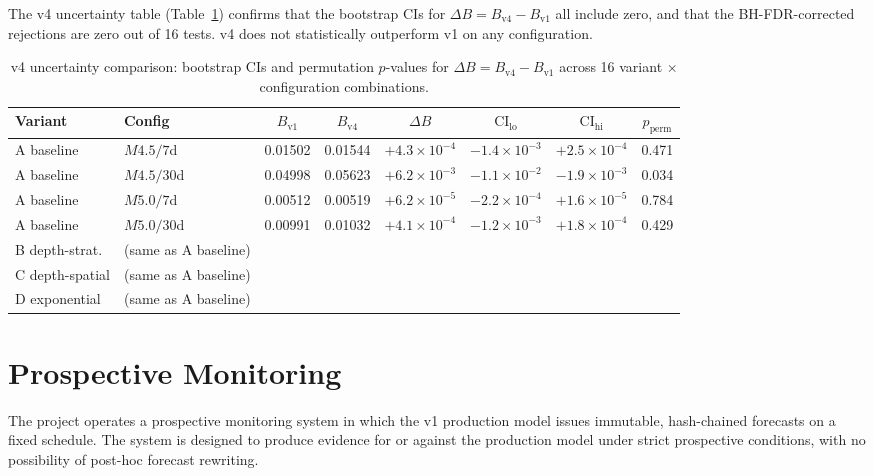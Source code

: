 \documentclass[10pt,a4paper,twocolumn]{article}
\begin{document}
The v4 uncertainty table (Table~\ref{tab:v4-uncertainty}) confirms that the bootstrap CIs for $\Delta B = B_{\text{v4}} - B_{\text{v1}}$ all include zero, and that the BH-FDR-corrected rejections are zero out of 16 tests. v4 does not statistically outperform v1 on any configuration.

\begin{table}[t]
\centering
\caption{v4 uncertainty comparison: bootstrap CIs and permutation $p$-values for $\Delta B = B_{\text{v4}} - B_{\text{v1}}$ across 16 variant $\times$ configuration combinations.}\label{tab:v4-uncertainty}
\small
\begin{tabular*}{\textwidth}{@{\extracolsep{\fill}}llcccccc}
\toprule
Variant & Config & $B_{\text{v1}}$ & $B_{\text{v4}}$ & $\Delta B$ & $\text{CI}_{\text{lo}}$ & $\text{CI}_{\text{hi}}$ & $p_{\text{perm}}$ \\
\midrule
A baseline        & $M4.5/7$d  & 0.01502 & 0.01544 & $+4.3\times10^{-4}$ & $-1.4\times10^{-3}$ & $+2.5\times10^{-4}$ & 0.471 \\
A baseline        & $M4.5/30$d & 0.04998 & 0.05623 & $+6.2\times10^{-3}$ & $-1.1\times10^{-2}$ & $-1.9\times10^{-3}$ & 0.034 \\
A baseline        & $M5.0/7$d  & 0.00512 & 0.00519 & $+6.2\times10^{-5}$ & $-2.2\times10^{-4}$ & $+1.6\times10^{-5}$ & 0.784 \\
A baseline        & $M5.0/30$d & 0.00991 & 0.01032 & $+4.1\times10^{-4}$ & $-1.2\times10^{-3}$ & $+1.8\times10^{-4}$ & 0.429 \\
B depth-strat.    & (same as A baseline) & & & & & & \\
C depth-spatial   & (same as A baseline) & & & & & & \\
D exponential     & (same as A baseline) & & & & & & \\
\bottomrule
\end{tabular*}
\end{table}

\section{Prospective Monitoring}\label{sec:prospective}

The project operates a prospective monitoring system in which the v1 production model issues immutable, hash-chained forecasts on a fixed schedule. The system is designed to produce evidence for or against the production model under strict prospective conditions, with no possibility of post-hoc forecast rewriting.
\end{document}
